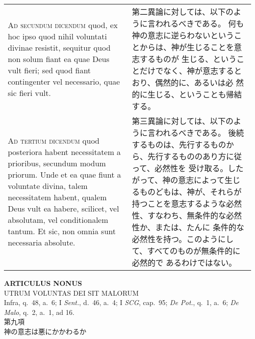 \documentclass[10pt]{jsarticle} %
\begin{document}
\begin{longtable}{p{21em}p{21em}}
\\


{\scshape Ad secundum dicendum} quod, ex hoc ipso quod
nihil voluntati divinae resistit, sequitur quod non solum fiant ea quae
Deus vult fieri; sed quod fiant contingenter vel necessario, quae sic
fieri vult.


&

第二異論に対しては、以下のように言われるべきである。
何も神の意志に逆らわないということからは、神が生じることを意志するものが
 生じる、ということだけでなく、神が意志するとおり、偶然的に、あるいは必
 然的に生じる、ということも帰結する。


\\


{\scshape Ad tertium dicendum} quod posteriora habent
necessitatem a prioribus, secundum modum priorum. Unde et ea quae fiunt
a voluntate divina, talem necessitatem habent, qualem Deus vult ea
habere, scilicet, vel absolutam, vel conditionalem tantum. Et sic, non
omnia sunt necessaria absolute.


&

第三異論に対しては、以下のように言われるべきである。
後続するものは、先行するものから、先行するもののあり方に従って、必然性を
 受け取る。したがって、神の意志によって生じるものどもは、神が、それらが
 持つことを意志するような必然性、すなわち、無条件的な必然性か、または、たんに
 条件的な必然性を持つ。このようにして、すべてのものが無条件的に必然的で
 あるわけではない。




\end{longtable}
\newpage





\begin{center}
 {\Large {\bf ARTICULUS NONUS}}\\
 {\large UTRUM VOLUNTAS DEI SIT MALORUM}\\
 {\footnotesize Infra, q.~48, a.~6; I {\itshape Sent.}, d.~46, a.~4; I
 {\itshape SCG}, cap.~95; {\itshape De Pot.}, q.~1, a.~6; {\itshape De
 Malo}, q.~2, a.~1, ad 16.}\\
 {\Large 第九項\\神の意志は悪にかかわるか}
\end{center}
\end{document}
